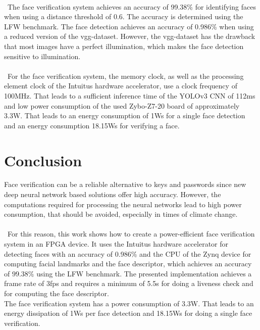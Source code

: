 \documentclass[%
a4paper,
twoside,
openany,
dvipsnames
]
{report}
\begin{document}
\\\
The face verification system achieves an accuracy of 99.38\% for identifying faces when using a distance threshold of 0.6. The accuracy is determined using the LFW benchmark. The face detection achieves an accuracy of 0.986\% when using a reduced version of the vgg-dataset. However, the vgg-dataset has the drawback that most images have a perfect illumination, which makes the face detection sensitive to illumination. \\
\\\
For the face verification system, the memory clock, as well as the processing element clock of the Intuitus hardware accelerator, use a clock frequency of 100\si{MHz}. That leads to a sufficient inference time of the YOLOv3 CNN of 112\si{ms} and low power consumption of the used Zybo-Z7-20 board of approximately 3.3\si{W}. That leads to an energy consumption of 1\si{Ws} for a single face detection and an energy consumption 18.15\si{Ws} for verifying a face. 



\chapter{Conclusion}
Face verification can be a reliable alternative to keys and passwords since new deep neural network based solutions offer high accuracy. However, the computations required for processing the neural networks lead to high power consumption, that should be avoided, especially in times of climate change.\\
\\\
For this reason, this work shows how to create a power-efficient face verification system in an \gls{FPGA} device. It uses the Intuitus hardware accelerator for detecting faces with an accuracy of  0.986\% and the \gls{CPU} of the Zynq device for computing facial landmarks and the face descriptor, which achieves an accuracy of $99.38\%$ using the LFW benchmark. The presented implementation achieves a frame rate of 3\gls{fps} and requires a minimum of 5.5\si{s} for doing a liveness check and for computing the face descriptor. \\
The face verification system has a power consumption of 3.3\si{W}. That leads to an energy dissipation of 1\si{Ws} per face detection and 18.15\si{Ws} for doing a single face verification. 
\end{document}
